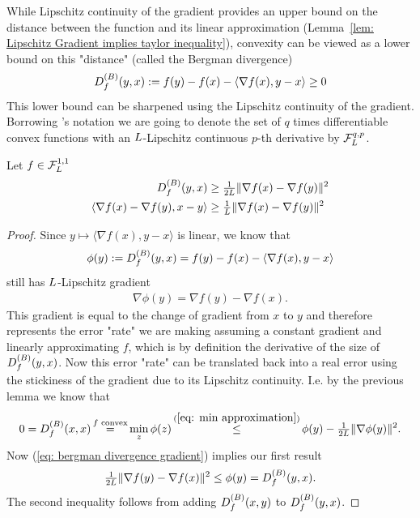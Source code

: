 While Lipschitz continuity of the gradient provides an upper
bound  on the distance between the function and its linear approximation
(Lemma~\ref{lem: Lipschitz Gradient implies taylor inequality}),
convexity can be viewed as a lower bound on this "distance" (called the 
Bergman divergence)
%
\begin{align*}
	\bergmanDiv{f}(y,x):= f(y)-f(x)-\langle \nabla f(x), y-x\rangle \ge 0
\end{align*}
%
This lower bound can be sharpened using the Lipschitz continuity of
the gradient.
Borrowing \citeauthor{nesterovLecturesConvexOptimization2018}'s notation
we are going to denote  the set of \(q\) times differentiable convex functions
with an \(\ubound\)-Lipschitz continuous \(p\)-th derivative by
\(\lipGradientSet[q,p]{\ubound}\).
%
\begin{lemma}\label{lem: bermanDiv lower bound}
	Let \(f\in\lipGradientSet{\ubound}\)
	\begin{subequations}
	\begin{align}
		\bergmanDiv{f}(y,x)
		&\ge \tfrac{1}{2\ubound}\|\nabla f(x) - \nabla f(y)\|^2\\
		\label{eq: bergmanDiv lower bound b}
		\langle \nabla f(x) - \nabla f(y), x-y\rangle
		&\ge \tfrac{1}{\ubound}\|\nabla f(x) - \nabla f(y)\|^2
	\end{align}	
	\end{subequations}	
\end{lemma}
\begin{proof}
	Since \(y\mapsto \langle\nabla f(x), y-x\rangle\) is linear, we know that
	\begin{align*}
		\phi(y):=\bergmanDiv{f}(y,x) = f(y)-f(x)-\langle \nabla f(x), y-x\rangle 
	\end{align*}
	still has \(\ubound\)-Lipschitz gradient
	\begin{align}\label{eq: bergman divergence gradient}
		\nabla\phi(y) = \nabla f(y) - \nabla f(x).
	\end{align}
	This gradient is equal to the change of gradient from \(x\) to \(y\) and 
	therefore represents the error "rate" we are making assuming a constant gradient
	and linearly approximating \(f\), which is by definition the derivative of the size of
	\(\bergmanDiv{f}(y,x)\). Now this error "rate" can be translated
 	back into a real error using the stickiness of the gradient due to
	its Lipschitz continuity. I.e. by the previous lemma we know that
	\begin{align*}
		0 = \bergmanDiv{f}(x,x)
		\xeq{f\text{ convex}} \min_z\phi(z)
		\xle{(\ref{eq: min approximation})} \phi(y) - \tfrac{1}{2\ubound}\|\nabla \phi(y)\|^2.
	\end{align*}
	Now (\ref{eq: bergman divergence gradient}) implies our first result
	\begin{align*}
		\tfrac{1}{2\ubound}\|\nabla f(y) - \nabla f(x)\|^2
		\le \phi(y) =\bergmanDiv{f}(y,x).
	\end{align*}
	The second inequality follows from adding \(\bergmanDiv{f}(x,y)\) to
	\(\bergmanDiv{f}(y,x)\).
\end{proof}

